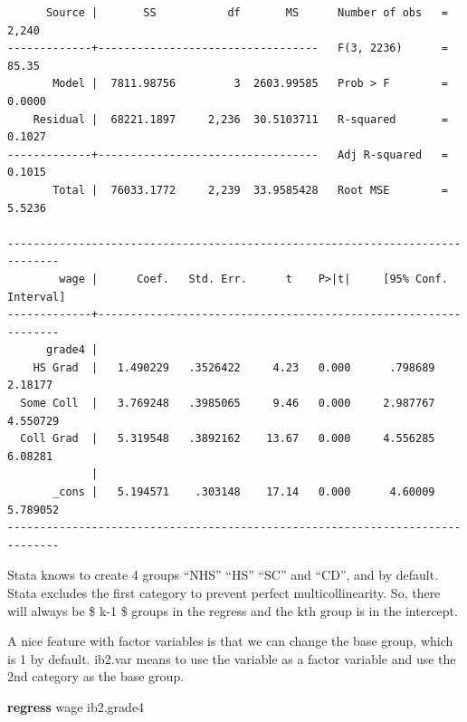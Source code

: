 \documentclass[
]{book}
\newenvironment{Shaded}{\begin{snugshade}}{\end{snugshade}}
\newcommand{\KeywordTok}[1]{\textcolor[rgb]{0.13,0.29,0.53}{\textbf{#1}}}
\newcommand{\NormalTok}[1]{#1}
\begin{document}
\begin{verbatim}
      Source |       SS           df       MS      Number of obs   =     2,240
-------------+----------------------------------   F(3, 2236)      =     85.35
       Model |  7811.98756         3  2603.99585   Prob > F        =    0.0000
    Residual |  68221.1897     2,236  30.5103711   R-squared       =    0.1027
-------------+----------------------------------   Adj R-squared   =    0.1015
       Total |  76033.1772     2,239  33.9585428   Root MSE        =    5.5236

------------------------------------------------------------------------------
        wage |      Coef.   Std. Err.      t    P>|t|     [95% Conf. Interval]
-------------+----------------------------------------------------------------
      grade4 |
    HS Grad  |   1.490229   .3526422     4.23   0.000      .798689     2.18177
  Some Coll  |   3.769248   .3985065     9.46   0.000     2.987767    4.550729
  Coll Grad  |   5.319548   .3892162    13.67   0.000     4.556285     6.08281
             |
       _cons |   5.194571    .303148    17.14   0.000      4.60009    5.789052
------------------------------------------------------------------------------
\end{verbatim}

Stata knows to create 4 groups ``NHS'' ``HS'' ``SC'' and ``CD'', and by default. Stata excludes the first category to prevent perfect multicollinearity. So, there will always be \$ k-1 \$ groups in the regress and the kth group is in the intercept.

A nice feature with factor variables is that we can change the base group, which is 1 by default. ib2.var means to use the variable as a factor variable and use the 2nd category as the base group.

\begin{Shaded}
\begin{Highlighting}[]
\KeywordTok{regress}\NormalTok{ wage ib2.grade4}
\end{Highlighting}
\end{Shaded}
\end{document}

